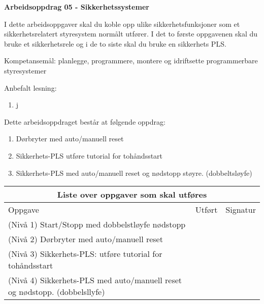 
\noindent
{\bf Arbeidsoppdrag 05 - Sikkerhetssystemer}

\vskip 5pt

I dette arbeidsoppgaver skal du koble opp ulike sikkerhetsfunksjoner som et sikkerhetsrelatert styresystem normålt utfører. I det to første oppgavenen skal du bruke et sikkerhetsrele og i de to siste skal du bruke en sikkerhets PLS. 

Kompetansemål:
planlegge, programmere, montere og idriftsette programmerbare styresystemer

Anbefalt lesning:

\begin{enumerate}
	\item j
\end{enumerate}


Dette arbeidsoppdraget består at følgende oppdrag:
\begin{enumerate}
	\item Dørbryter med auto/manuell reset
	\item Sikkerhets-PLS utføre tutorial for tohåndsstart	 
	\item Sikkerhets-PLS med auto/manuell reset og nødstopp støyre. (dobbeltsløyfe) 
\end{enumerate}


\begin{center}
\begin{tabular}{ | m{10cm} | m{1cm}| m{2cm} | } 
\hline
\multicolumn{3}{|c|}{Liste over oppgaver som skal utføres} \\
	\hline
	Oppgave	& Utført & Signatur \\ 
	\hline
	\hline
	\cellcolor{green!60}(Nivå 1) Start/Stopp med dobbelstløyfe nødstopp &&\\
	\hline
	\cellcolor{yellow!60}(Nivå 2) Dørbryter med auto/manuell reset & & \\ 
	\hline
	\cellcolor{orange!60}(Nivå 3) Sikkerhets-PLS: utføre tutorial for tohåndsstart	& & \\ 
	\hline
	\cellcolor{red!60}(Nivå 4) Sikkerhets-PLS med auto/manuell reset og nødstopp. (dobbelsllyfe)	& & \\ 
	\hline
\end{tabular}
\end{center}


